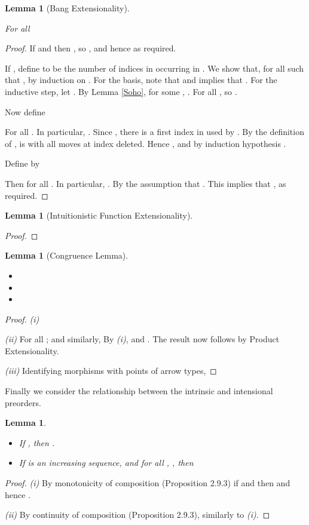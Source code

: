 \documentclass[11pt]{article}
\newtheorem{lemma}[theorem]{Lemma}
\begin{document}
\begin{lemma}[Bang Extensionality]\label{BE}

For all 

\end{lemma}
\begin{proof}  If  and
 then , so
, and hence
 as required.

 If , define  to be
the number of indices in  occurring in . We show
that, for all  such that
, by induction on
.  For the basis, note that  and 
implies that . For the inductive step, let
. By Lemma \ref{Soho}, for some ,
. For all
, so
.

Now define

For all . In
particular, .
Since , there is a first index  in  used by
. By the definition of ,  is
 with all moves at index  deleted. Hence
, and by induction hypothesis
.

Define  by

Then for all . In particular, . By the assumption that . This implies that , as required.
\end{proof}

\begin{lemma}[Intuitionistic Function Extensionality]

\end{lemma}

\begin{proof}

\end{proof}

\begin{lemma}[Congruence Lemma]
\begin{itemize}
\item[(i)] 
\item[(ii)] 
\item[(iii)] 
\end{itemize}
\end{lemma}

\begin{proof} {\it (i)}


{\it (ii)}
For all ;
and similarly,  By {\it (i)}, 
and . The result now follows by Product
Extensionality.

{\it (iii)} Identifying morphisms with points of arrow types,

\end{proof}

Finally we consider the relationship between the intrinsic
and intensional preorders.

\begin{lemma}\label{II}
\begin{itemize}
\item[(i)] If , then .
\item[(ii)] If  is an
  increasing sequence, and for all , , then
  
\end{itemize}
\end{lemma}
\begin{proof} {\it (i)} By monotonicity of composition
(Proposition 2.9.3) if  and
 then 
and hence .

{\it (ii)} By continuity of composition (Proposition
2.9.3), similarly to {\it (i)}.
\end{proof}
\end{document}
